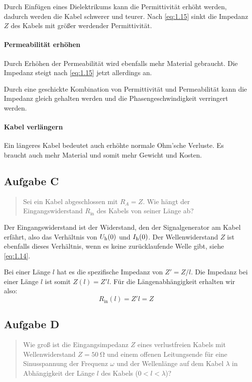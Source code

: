Durch Einfügen eines Dielektrikums kann die Permittivität erhöht werden,
dadurch werden die Kabel schwerer und teurer. Nach \eqref{eq:1.15} sinkt die
Impedanz $Z$ des Kabels mit größer werdender Permittivität.

\paragraph{Permeabilität erhöhen}

Durch Erhöhen der Permeabilität wird ebenfalls mehr Material gebraucht. Die
Impedanz steigt nach \eqref{eq:1.15} jetzt allerdings an.

Durch eine geschickte Kombination von Permittivität und Permeabilität kann die
Impedanz gleich gehalten werden und die Phasengeschwindigkeit verringert
werden.

\paragraph{Kabel verlängern}

Ein längeres Kabel bedeutet auch erhöhte normale Ohm'sche Verluste. Es braucht
auch mehr Material und somit mehr Gewicht und Kosten.

\subsection{Aufgabe C}

\begin{quote}
	Sei ein Kabel abgeschlossen mit $R_A = Z$. Wie hängt der Eingangswiderstand
	$R_\text{in}$ des Kabels von seiner Länge ab?
\end{quote}

Der Eingangswiderstand ist der Widerstand, den der Signalgenerator am Kabel
erfährt, also das Verhältnis von $U_\text h(0)$ und $I_\text h(0)$. Der
Wellenwiderstand $Z$ ist ebenfalls dieses Verhältnis, wenn es keine
zurücklaufende Welle gibt, siehe \eqref{eq:1.14}.

Bei einer Länge $l$ hat es die spezifische Impedanz von $Z' = Z/l$. Die
Impedanz bei einer Länge $l$ ist somit $Z(l) = Z' l$. Für die
Längenabhängigkeit erhalten wir also:
\[
	R_\text{in}(l) = Z' l = Z
\]

\subsection{Aufgabe D}

\begin{quote}
	Wie groß ist die Eingangsimpedanz $Z$ eines verlustfreien Kabels mit
	Wellenwiderstand $Z = \SI{50}\ohm$ und einem offenen Leitungsende für eine
	Sinusspannung der Frequenz $\omega$ und der Wellenlänge auf dem Kabel
	$\lambda$ in Abhängigkeit der Länge $l$ des Kabels ($0 < l < \lambda$)?
\end{quote}

